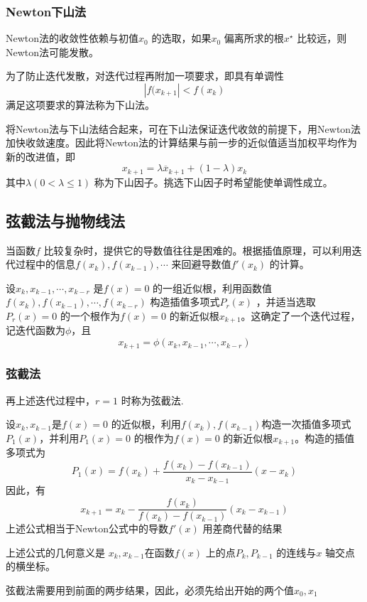 \documentclass[a4paper]{article}
\begin{document}
\subsubsection{Newton下山法}
Newton法的收敛性依赖与初值$x_0$ 的选取，如果$x_0$ 偏离所求的根$x^{\star}$ 比较远，则Newton法可能发散。

为了防止迭代发散，对迭代过程再附加一项要求，即具有单调性
\[
| f(x_{k+1} | < f(x_{k}) \tag{5.3.5} \label{eq:5.3.5} 
\] 
满足这项要求的算法称为下山法。

将Newton法与下山法结合起来，可在下山法保证迭代收敛的前提下，用Newton法加快收敛速度。因此将Newton法的计算结果与前一步的近似值适当加权平均作为新的改进值，即
\[
	x_{k+1} = \lambda \overline{x}_{k+1} + (1 - \lambda) x_{k} \tag{5.3.6} \label{eq:5.3.6} 
\] 
其中$\lambda(0 < \lambda \le 1)$ 称为下山因子。挑选下山因子时希望能使单调性成立。

\subsection{弦截法与抛物线法}
当函数$f$ 比较复杂时，提供它的导数值往往是困难的。根据插值原理，可以利用迭代过程中的信息$f(x_{k}), f(x_{k-1}),\cdots$ 来回避导数值$f'(x_{k})$ 的计算。

设$x_{k}, x_{k-1}, \cdots, x_{k-r}$ 是$f(x) = 0$ 的一组近似根，利用函数值$f(x_{k}), f(x_{k-1}), \cdots, f(x_{k-r})$ 构造插值多项式$P_r(x)$ ，并适当选取$P_r(x) = 0$ 的一个根作为$f(x) = 0$ 的新近似根$x_{k+1}$。这确定了一个迭代过程，记迭代函数为$\phi$，且
\[
x_{k+1} = \phi(x_{k}, x_{k-1}, \cdots, x_{k-r})
\] 

\subsubsection{弦截法}
再上述迭代过程中，$r=1$ 时称为弦截法.

设$x_{k}, x_{k-1}$是$f(x) = 0$ 的近似根，利用$f(x_{k}), f(x_{k-1})$构造一次插值多项式$P_1(x)$，并利用$P_1(x) = 0$ 的根作为$f(x) = 0$ 的新近似根$x_{k+1}$。构造的插值多项式为
\[
P_1(x) = f(x_{k}) + \frac{f(x_{k}) - f(x_{k-1})}{x_{k} - x_{k-1}} (x - x_{k}) \tag{5.4.1} \label{eq:5.4.1} 
\] 
因此，有
\[
x_{k+1} = x_{k} - \frac{f(x_{k})}{f(x_{k}) - f(x_{k-1})} (x_{k} - x_{k-1}) \tag{5.4.2} \label{eq:5.4.2} 
\] 
上述公式相当于Newton公式中的导数$f'(x)$ 用差商代替的结果

上述公式的几何意义是 $x_{k}, x_{k-1}$在函数$f(x)$ 上的点$P_k, P_{k-1}$ 的连线与$x$ 轴交点的横坐标。

弦截法需要用到前面的两步结果，因此，必须先给出开始的两个值$x_0, x_1$ 
\end{document}
